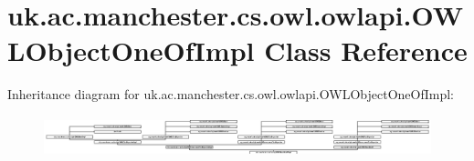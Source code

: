 \hypertarget{classuk_1_1ac_1_1manchester_1_1cs_1_1owl_1_1owlapi_1_1_o_w_l_object_one_of_impl}{\section{uk.\-ac.\-manchester.\-cs.\-owl.\-owlapi.\-O\-W\-L\-Object\-One\-Of\-Impl Class Reference}
\label{classuk_1_1ac_1_1manchester_1_1cs_1_1owl_1_1owlapi_1_1_o_w_l_object_one_of_impl}
}
Inheritance diagram for uk.\-ac.\-manchester.\-cs.\-owl.\-owlapi.\-O\-W\-L\-Object\-One\-Of\-Impl\-:\begin{figure}[H]
\begin{center}
\leavevmode
\includegraphics[height=1.186441cm]{classuk_1_1ac_1_1manchester_1_1cs_1_1owl_1_1owlapi_1_1_o_w_l_object_one_of_impl}
\end{center}
\end{figure}

